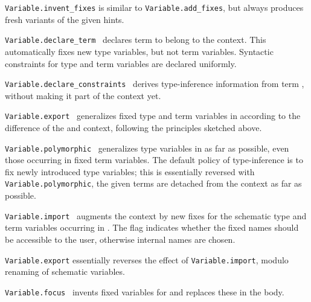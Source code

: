\begin{isabellebody}
\begin{isamarkuptext}
\begin{description}
  \item \verb|Variable.invent_fixes| is similar to \verb|Variable.add_fixes|, but always produces fresh variants of the given
  hints.

  \item \verb|Variable.declare_term|~ declares term
   to belong to the context.  This automatically fixes new
  type variables, but not term variables.  Syntactic constraints for
  type and term variables are declared uniformly.

  \item \verb|Variable.declare_constraints|~ derives
  type-inference information from term , without making it
  part of the context yet.

  \item \verb|Variable.export|~ generalizes
  fixed type and term variables in  according to the
  difference of the  and  context,
  following the principles sketched above.

  \item \verb|Variable.polymorphic|~ generalizes type
  variables in  as far as possible, even those occurring
  in fixed term variables.  The default policy of type-inference is to
  fix newly introduced type variables; this is essentially reversed
  with \verb|Variable.polymorphic|, the given terms are detached from
  the context as far as possible.

  \item \verb|Variable.import|~ augments the
  context by new fixes for the schematic type and term variables
  occurring in .  The  flag indicates
  whether the fixed names should be accessible to the user, otherwise
  internal names are chosen.

  \verb|Variable.export| essentially reverses the effect of \verb|Variable.import|, modulo renaming of schematic variables.

  \item \verb|Variable.focus|~ invents fixed variables
  for  and replaces these in the
  body.


\end{description}
\end{isamarkuptext}
\end{isabellebody}
